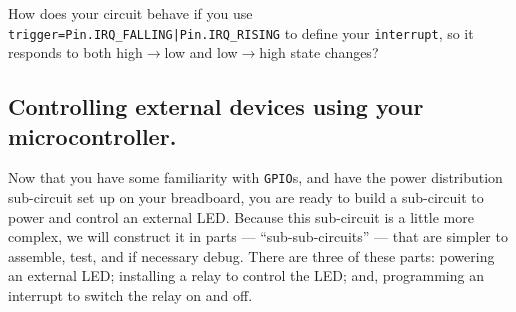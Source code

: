 \begin{enumerate}
	\smallskip
	How does your circuit behave if you use \lstinline{trigger=Pin.IRQ_FALLING|Pin.IRQ_RISING} to define your \texttt{interrupt}, so it responds to both high$\rightarrow$low and low$\rightarrow$high state changes?
\end{enumerate}



\subsection{Controlling external devices using your microcontroller.}
Now that you have some familiarity with \texttt{GPIO}s, and have the power distribution sub-circuit set up on your breadboard, you are ready to build a sub-circuit to power and control an external LED. 
Because this sub-circuit is a little more complex, we will construct it in parts --- ``sub-sub-circuits'' --- that are simpler to assemble, test, and if necessary debug.
There are three of these parts: powering an external LED; installing a relay to control the LED; and, programming an interrupt to switch the relay on and off.
